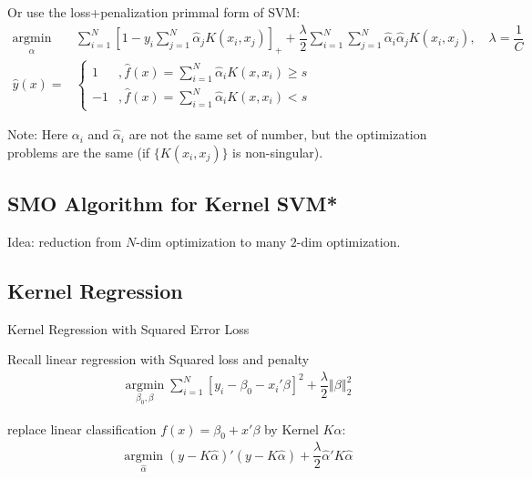     Or use the loss+penalization primmal form of SVM:
    \begin{align}
        \mathop{\arg\min}\limits_{\hat{\alpha } }&\sum_{i=1}^N\left[ 1-y_i\sum_{j=1}^N\hat{\alpha }_jK(x_i,x_j) \right]_++\dfrac{\lambda }{2}\sum_{i=1}^N\sum_{j=1}^N\hat{\alpha }_i\hat{\alpha }_jK(x_i,x_j),\quad \lambda =\dfrac{1}{C} \\
        \hat{y}(x)=&\begin{cases}
            1 &,\hat{f}(x)=\sum_{i=1}^N\hat{\alpha }_iK(x,x_i)\geq s\\
            -1&,\hat{f}(x)=\sum_{i=1}^N\hat{\alpha }_iK(x,x_i)<s
        \end{cases}
    \end{align}
    
    Note: Here $ \alpha _i $ and $ \hat{\alpha }_i $ are not the same set of number, but the optimization problems are the same (if $ \{K(x_i,x_j)\} $ is non-singular). 

\subsection{SMO Algorithm for Kernel SVM*}
    
Idea: reduction from $ N $-dim optimization to many $ 2 $-dim optimization.
    
\subsection{Kernel Regression}\label{SubSubSectionKernelRegression}
\begin{point}
    Kernel Regression with Squared Error Loss
\end{point}

     Recall linear regression with Squared loss and penalty
     \begin{align}
        \mathop{\arg\min}\limits_{\beta _0,\beta  }\sum_{i=1}^N\left[ y_i-\beta _0-x_i'\beta  \right]^2+\dfrac{\lambda }{2}\left\Vert \beta \right\Vert^2_2
     \end{align}

     replace linear classification $ f(x)=\beta _0+x'\beta  $ by Kernel $ K\alpha  $:
     \begin{align}
        \mathop{\arg\min}\limits_{\hat{\alpha }}(y-K\hat{\alpha } )'(y-K\hat{\alpha } ) +\dfrac{\lambda }{2}\hat{\alpha } 'K\hat{\alpha } 
     \end{align}

